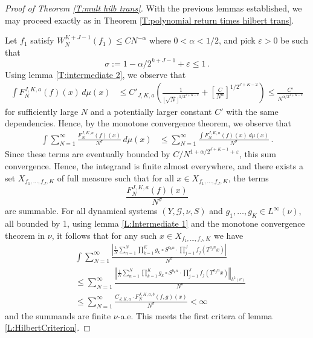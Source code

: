 \documentclass[11pt, oneside]{amsart}   	%
\newcommand{\ep}{\varepsilon}
\newcommand{\1}{\mathbbm{1}}
\newcommand{\floor}[1]{\lfloor#1\rfloor}
\theoremstyle{definition}
\begin{document}
\begin{proof}[Proof of Theorem \ref{T:mult hilb trans}]
With the previous lemmas established, we may proceed exactly as in Theorem \ref{T:polynomial return times hilbert trans}.

Let $f_1$ satisfy $W_N^{K+J-1}(f_1) \leq CN^{-\alpha}$ where $0 < \alpha < 1/2$, and pick $\ep > 0$ be such that 
$$\sigma := 1- \alpha/2^{k+J-1} + \ep \leq 1 \, .$$ 
Using lemma \ref{T:intermediate 2}, we observe that 
\begin{align}\label{E:bound of F by polynomial}
\int F_N^{J, K, a}(f)(x) \, d\mu(x) &\leq C'_{J, K, a} \left( \frac{1}{\floor{\sqrt{N}}^{1/2^{J+K-2}}} + \left[ \frac{C}{N^\alpha}\right]^{1/2^{J+K-2}}\right) \leq \frac{C'}{N^{\alpha/2^{J+K-2}}}
\end{align}
for sufficiently large $N$ and a potentially larger constant $C'$ with the same dependencies. Hence, by the monotone convergence theorem, we observe that
\begin{align*}
\int \sum_{N=1}^\infty \frac{F_N^{J, K, a}(f)(x)}{N^\sigma} \, d\mu(x) &\leq  \sum_{N=1}^\infty \frac{\int F_N^{J, K, a}(f)(x) \, d\mu(x)}{N^\sigma} \, . %
\end{align*}
Since these terms are eventually bounded by $C/N^{1 + \alpha/2^{J+K-1} + \ep}$, this sum convergence. Hence, the integrand is finite almost everywhere, and  there exists a set $X_{f_1, \dots, f_J, K}$ of full measure such that for all $x\in X_{f_1, \dots, f_J, K}$, the terms
$$\frac{F_{N}^{J, K, a}(f)(x)}{N^\sigma}$$
are summable. For all dynamical systems $(Y,  \mathcal{G},\nu, S)$ and $g_1, \dots, g_K\in L^\infty(\nu)$, all bounded by 1, using lemma \ref{L:Intermediate 1} and the monotone convergence theorem in $\nu$, it follows that for any such $x\in X_{f_1, \dots, f_J, K}$ we have
\begin{align*}
&\int \sum_{N=1}^\infty \frac{\left|\frac{1}{N} \sum_{n=1}^N  \prod_{k=1}^K g_k \circ S^{b_k n} \cdot \prod_{j=1}^J f_j(T^{a_jn}x) \right|}{N^\sigma} \\&\leq \sum_{N=1}^\infty \frac{\left\Vert\frac{1}{N} \sum_{n=1}^N  \prod_{k=1}^K g_k \circ S^{b_k n} \cdot \prod_{j=1}^J f_j(T^{a_jn}x) \right\Vert_{L^2(\nu)}}{N^\sigma} 
\\ &\leq \sum_{N=1}^\infty  \frac{C_{J, K, a} \cdot F_N^{J, K, a, b} (f, g)(x)}{N^\sigma} < \infty
\end{align*}
and the summands are finite $\nu$-a.e. This meets the first critera of lemma \ref{L:HilbertCriterion}.


\end{proof}
\end{document}
